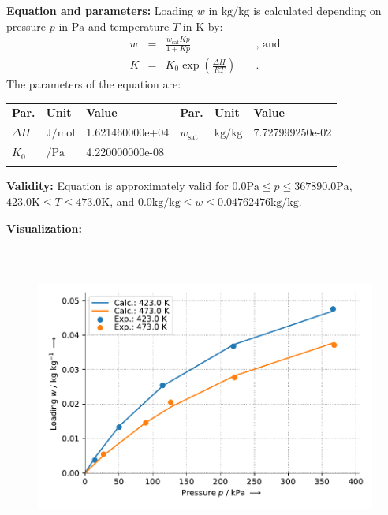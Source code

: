 \textbf{Equation and parameters:}
\newline
%
Loading $w$ in $\si{\kilogram\per\kilogram}$ is calculated depending on pressure $p$ in $\si{\pascal}$ and temperature $T$ in $\si{\kelvin}$ by:
%
\begin{equation*}
\begin{split}
w &=& \frac{w_\mathrm{sat} K p}{1 + K p} & \quad\text{, and} \\
K &=& K_0 \exp \left( \frac{\Delta H}{R T} \right) & \quad\text{.}
\end{split}
\end{equation*}
%
The parameters of the equation are:
%
\begin{longtable}[l]{lll|lll}
\toprule
\addlinespace
\textbf{Par.} & \textbf{Unit} & \textbf{Value} &	\textbf{Par.} & \textbf{Unit} & \textbf{Value} \\
\addlinespace
\midrule
\endhead

\bottomrule
\endfoot
\bottomrule
\endlastfoot
\addlinespace

$\Delta H$ & $\si{\joule\per\mole}$ & 1.621460000e+04 & $w_\mathrm{sat}$ & $\si{\kilogram\per\kilogram}$ & 7.727999250e-02 \\
$K_0$ & $\si{\per\pascal}$ & 4.220000000e-08 & & & \\

\addlinespace\end{longtable}

\textbf{Validity:}
\newline
Equation is approximately valid for $0.0 \si{\pascal} \leq p \leq 367890.0 \si{\pascal}$,  $423.0 \si{\kelvin} \leq T \leq 473.0 \si{\kelvin}$, and $0.0 \si{\kilogram\per\kilogram} \leq w \leq 0.04762476 \si{\kilogram\per\kilogram}$.
\newline

\textbf{Visualization:}
%
\begin{figure}[!htp]
{\noindent\includegraphics[height=10cm, keepaspectratio]{figs/ads/ads_Propane_zeolite_pellet_4A_Langmuir_1.pdf}}
\end{figure}
%

